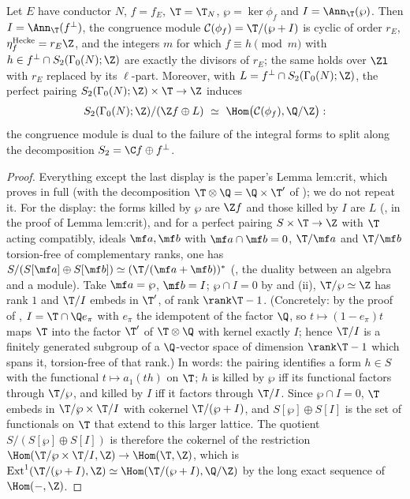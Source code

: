 \begin{theorem}\label{thm:congruence:crit}
Let $E$ have conductor $N$, $f=f_E$, $\T=\T_N$, $\wp=\ker\phi_f$ and $I=\Ann_\T(\wp)$. Then $I=\Ann_\T(f^\perp)$, the congruence module $\mathcal C(\phi_f)=\T/(\wp+I)$ is cyclic of order $r_E$,
$\eta^{\mathrm{Hecke}}_f=r_E\Z$, and the integers $m$ for which $f\equiv h\pmod m$ with $h\in f^\perp\cap S_2(\Gamma_0(N);\Z)$ are exactly the divisors of $r_E$; the same holds over $\Zl$ with $r_E$
replaced by its $\ell$-part. Moreover, with $L=f^\perp\cap S_2(\Gamma_0(N);\Z)$, the perfect pairing $S_2(\Gamma_0(N);\Z)\times\T\to\Z$ induces
\[
S_2(\Gamma_0(N);\Z)/(\Z f\oplus L)\ \simeq\ \Hom\bigl(\mathcal C(\phi_f),\Q/\Z\bigr):
\]
the congruence module is dual to the failure of the integral forms to split along the decomposition $S_2=\C f\oplus f^\perp$.
\end{theorem}

\begin{proof}
Everything except the last display is the paper's Lemma lem:crit, which  proves in full (with the decomposition $\T\otimes\Q=\Q\times\T'$ of );
we do not repeat it. For the display: the forms killed by $\wp$ are $\Z f$ and those killed by $I$ are $L$ (, in the proof of Lemma lem:crit), and for a
perfect pairing $S\times\T\to\Z$ with $\T$ acting compatibly, ideals $\mf a,\mf b$ with $\mf a\cap\mf b=0$, $\T/\mf a$ and $\T/\mf b$ torsion-free of complementary ranks, one has
$S/(S[\mf a]\oplus S[\mf b])\simeq(\T/(\mf a+\mf b))^*$ (, the duality between an algebra and a module). Take $\mf a=\wp$, $\mf b=I$; $\wp\cap I=0$ by
 and (ii), $\T/\wp\simeq\Z$ has rank $1$ and $\T/I$ embeds in $\T'$, of rank $\rank\T-1$. (Concretely: by the proof of
, $I=\T\cap\Q e_\pi$ with $e_\pi$ the idempotent of the factor $\Q$, so $t\mapsto(1-e_\pi)t$ maps $\T$ into the factor $\T'$ of $\T\otimes\Q$ with kernel exactly
$I$; hence $\T/I$ is a finitely generated subgroup of a $\Q$-vector space of dimension $\rank\T-1$ which spans it, torsion-free of that rank.) In words: the pairing identifies a form $h\in S$ with the
functional $t\mapsto a_1(th)$ on $\T$; $h$ is killed by $\wp$ iff its functional factors through $\T/\wp$, and killed by $I$ iff it factors through $\T/I$. Since $\wp\cap I=0$, $\T$ embeds in
$\T/\wp\times\T/I$ with cokernel $\T/(\wp+I)$, and $S[\wp]\oplus S[I]$ is the set of functionals on $\T$ that extend to this larger lattice. The quotient $S/(S[\wp]\oplus S[I])$ is therefore the
cokernel of the restriction $\Hom(\T/\wp\times\T/I,\Z)\to\Hom(\T,\Z)$, which is $\operatorname{Ext}^1(\T/(\wp+I),\Z)\simeq\Hom(\T/(\wp+I),\Q/\Z)$ by the long exact sequence of $\Hom(-,\Z)$.
\end{proof}

